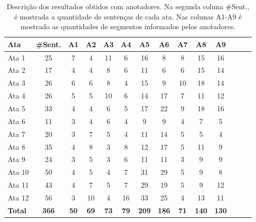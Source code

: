 \begin{table}[!h]
	\centering
	\begin{tabular}{|l|c|c|c|c|c|c|c|c|c|c|c|c|c|} \hline
		\textbf{Ata} & \textbf{\#Sent.}  & 
		\textbf{A1}  & 
		\textbf{A2}  & 
		\textbf{A3}  & 
		\textbf{A4}  & 
		\textbf{A5}  & 
		\textbf{A6}  & 
		\textbf{A7}  & 
		\textbf{A8}  & 
		\textbf{A9} 
		\\	\hline
		Ata 1  & 25 & 7  & 4  & 11 & 6  & 16 & 8  & 8  & 15 & 16 \\ \hline 
		Ata 2  & 17 & 4  & 4  & 8  & 6  & 11 & 6  & 6  & 15 & 14 \\ \hline 
		Ata 3  & 26 & 6  & 6  & 8  & 4  & 15 & 9  & 10 & 18 & 14 \\ \hline 
		Ata 4  & 26 & 5  & 5  & 10 & 6  & 14 & 17 & 7  & 11 & 12 \\ \hline 
		Ata 5  & 33 & 4  & 4  & 6  & 5  & 17 & 22 & 9  & 18 & 16 \\ \hline 
		Ata 6  & 11 & 3  & 4  & 6  & 4  & 9  & 9  & 4  & 7  &  5 \\ \hline 
		Ata 7  & 20 & 3  & 7  & 5  & 4  & 11 & 14 & 5  & 5  &  4 \\ \hline 
		Ata 8  & 35 & 4  & 8  & 3  & 8  & 12 & 17 & 5  & 11 &  9 \\ \hline 
		Ata 9  & 24 & 3  & 5  & 3  & 6  & 11 & 11 & 3  & 9  &  9 \\ \hline 
		Ata 10 & 50 & 4  & 5  & 4  & 7  & 31 & 29 & 5  & 9  &  8 \\ \hline 
		Ata 11 & 43 & 4  & 7  & 5  & 7  & 29 & 19 & 5  & 9  & 12 \\ \hline 
		Ata 12 & 56 & 3  & 10 & 4  & 16 & 33 & 25 & 4  & 13 & 11 \\ \hline 
		\textbf{Total} &
		\textbf{366} & 
		\textbf{50}&  
		\textbf{69} & 
		\textbf{73}&  
		\textbf{79}&  
		\textbf{209} & 
		\textbf{186}&  
		\textbf{71}&  
		\textbf{140}&  
		\textbf{130} 
		\\ \hline 

	\end{tabular}
	\caption{Descrição dos resultados obtidos com anotadores. Na segunda coluna \#Sent., é mostrada a quantidade de sentenças de cada ata. Nas colunas A1-A9 é mostrado as quantidades de segmentos informados pelos anotadores. 
} 

	\label{tab:ataseanotacoes}
\end{table}

















